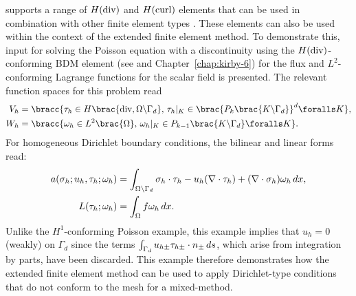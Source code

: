 \ffc{} supports a range of $H(\rm div)$ and $H(\rm curl)$ elements
that can be used in combination with other finite element types
\citep{RognesKirbyLogg2009}. These elements can also be used within the
context of the extended finite element method. To demonstrate this, \ufl{}
input for solving the Poisson equation with a discontinuity using the
$H(\rm div)$-conforming BDM element (see \citet{BrezziDouglasMarini1985}
and Chapter~\ref{chap:kirby-6}) for the flux and $L^{2}$-conforming Lagrange
functions for the scalar field is presented.  The relevant function
spaces for this problem read
%
\begin{align}
  V_{h} &= \bracc{\vect{\tau}_{h} \in H\brac{{\rm div}, \Omega\backslash\Gamma_{d}}, \,
         \vect{\tau}_{h}|_{K} \in \brac{P_{k}\brac{K \backslash \Gamma_{d}}}^{d} \foralls K},
\label{eqn:nikbakht:BDM_space}
\\
  W_{h} &= \bracc{\omega_{h} \in L^{2}\brac{\Omega}, \,
         \omega_{h}|_{K} \in P_{k-1}\brac{K \backslash \Gamma_{d}}\foralls K}.
\label{eqn:nikbakht:DG_space}
\end{align}
%
For homogeneous Dirichlet boundary conditions, the bilinear and linear
forms read:
%
\begin{align}
  a(\sigma_{h}; u_{h}, \tau_{h}; \omega_{h})
    &= \int_{\Omega\backslash\Gamma_{d}} \sigma_{h} \cdot  \tau_{h}
        - u_{h} (\nabla \cdot \tau_{h}) + (\nabla \cdot \sigma_{h}) \omega_{h} \, d x,
\\
  L(\tau_{h}; \omega_{h}) &= \int_{\Omega} f \omega_{h}  \, d x.
\end{align}
%
Unlike the $H^{1}$-conforming Poisson example, this example implies that
$u_{h} = 0$ (weakly) on $\Gamma_{d}$ since the terms $\int_{\Gamma_{d}}
u_{h\pm} \tau_{h\pm} \cdot n_{\pm} \, d s$, which arise
from integration by parts, have been discarded.  This example therefore
demonstrates how the extended finite element method can be used to
apply Dirichlet-type conditions that do not conform to the mesh for
a mixed-method.

